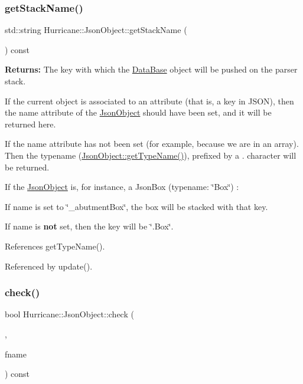 \subsubsection{\texorpdfstring{get\+Stack\+Name()}{getStackName()}}
{\footnotesize\ttfamily std\+::string Hurricane\+::\+Json\+Object\+::get\+Stack\+Name (\begin{DoxyParamCaption}{ }\end{DoxyParamCaption}) const\hspace{0.3cm}{\ttfamily [inline]}}

{\bfseries Returns\+:} The key with which the \mbox{\hyperlink{classHurricane_1_1DataBase}{Data\+Base}} object will be pushed on the parser stack.

If the current object is associated to an attribute (that is, a key in J\+S\+ON), then the {\ttfamily name} attribute of the \mbox{\hyperlink{classHurricane_1_1JsonObject}{Json\+Object}} should have been set, and it will be returned here.

If the {\ttfamily name} attribute has not been set (for example, because we are in an array). Then the typename (\mbox{\hyperlink{classHurricane_1_1JsonObject_a947e1c3f8dbae63bb2d086b5b827a2a5}{Json\+Object\+::get\+Type\+Name()}}), prefixed by a {\ttfamily \textquotesingle{}}.\textquotesingle{} character will be returned.

If the \mbox{\hyperlink{classHurricane_1_1JsonObject}{Json\+Object}} is, for instance, a Json\+Box (typename\+: {\ttfamily \char`\"{}\+Box\char`\"{}}) \+:
\begin{DoxyItemize}
\item If {\ttfamily name} is set to {\ttfamily \char`\"{}\+\_\+abutment\+Box\char`\"{}}, the box will be stacked with that key.
\item If {\ttfamily name} is {\bfseries not} set, then the key will be {\ttfamily \char`\"{}.\+Box\char`\"{}}. 
\end{DoxyItemize}

References get\+Type\+Name().



Referenced by update().

\mbox{\label{classHurricane_1_1JsonObject_a6ac9230d36590f83fbe1561b6c1bb0e5}} 
\subsubsection{\texorpdfstring{check()}{check()}}
{\footnotesize\ttfamily bool Hurricane\+::\+Json\+Object\+::check (\begin{DoxyParamCaption}\item[{\mbox{\hyperlink{classHurricane_1_1JsonStack}{Json\+Stack}} \&}]{,  }\item[{std\+::string}]{fname }\end{DoxyParamCaption}) const}



